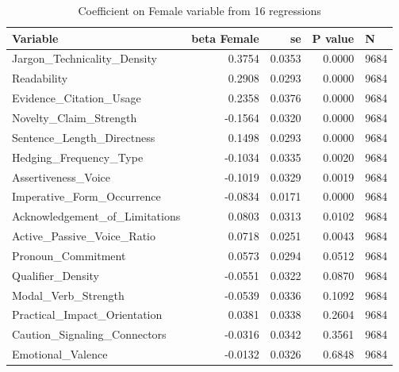 \begin{table}
\caption{Coefficient on Female variable from 16 regressions}
\label{tab:reg}
\begin{tabular}{lrrrl}
\toprule
Variable & beta Female & se & P value & N \\
\midrule
Jargon\_Technicality\_Density & 0.3754 & 0.0353 & 0.0000 & 9684 \\
Readability & 0.2908 & 0.0293 & 0.0000 & 9684 \\
Evidence\_Citation\_Usage & 0.2358 & 0.0376 & 0.0000 & 9684 \\
Novelty\_Claim\_Strength & -0.1564 & 0.0320 & 0.0000 & 9684 \\
Sentence\_Length\_Directness & 0.1498 & 0.0293 & 0.0000 & 9684 \\
Hedging\_Frequency\_Type & -0.1034 & 0.0335 & 0.0020 & 9684 \\
Assertiveness\_Voice & -0.1019 & 0.0329 & 0.0019 & 9684 \\
Imperative\_Form\_Occurrence & -0.0834 & 0.0171 & 0.0000 & 9684 \\
Acknowledgement\_of\_Limitations & 0.0803 & 0.0313 & 0.0102 & 9684 \\
Active\_Passive\_Voice\_Ratio & 0.0718 & 0.0251 & 0.0043 & 9684 \\
Pronoun\_Commitment & 0.0573 & 0.0294 & 0.0512 & 9684 \\
Qualifier\_Density & -0.0551 & 0.0322 & 0.0870 & 9684 \\
Modal\_Verb\_Strength & -0.0539 & 0.0336 & 0.1092 & 9684 \\
Practical\_Impact\_Orientation & 0.0381 & 0.0338 & 0.2604 & 9684 \\
Caution\_Signaling\_Connectors & -0.0316 & 0.0342 & 0.3561 & 9684 \\
Emotional\_Valence & -0.0132 & 0.0326 & 0.6848 & 9684 \\
\bottomrule
\end{tabular}
\end{table}
